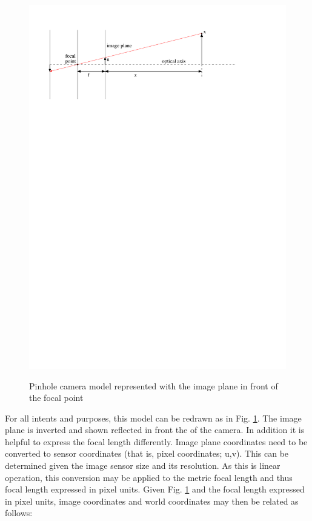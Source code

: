 \begin{figure}[h]
  \centering
    \includegraphics[width=1.0\textwidth]{chapters/images/pinhole_cam_2} \\
  \caption{Pinhole camera model represented with the image plane in front of the focal point}
  \label{fig:pinhole_normal}
\end{figure}

For all intents and purposes, this model can be redrawn as in Fig. \ref{fig:pinhole_normal}. The image plane is inverted and shown reflected in front the of the camera.  In addition it is helpful to express the focal length differently.  Image plane coordinates need to be converted to sensor coordinates (that is, pixel coordinates; u,v).  This can be determined given the image sensor size and its resolution.  As this is linear operation, this conversion may be applied to the metric focal length and thus focal length expressed in pixel units.  Given Fig. \ref{fig:pinhole_normal} and the focal length expressed in pixel units, image coordinates and world coordinates may then be related as follows: 

